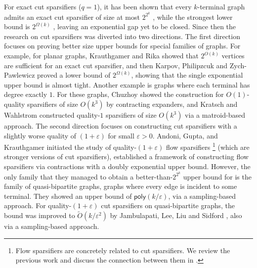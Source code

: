 \documentclass[11pt]{article}
\theoremstyle{definition}
\newcommand{\eps}{{\varepsilon}}
\newcommand{\poly}{\mathsf{poly}}
\newcounter{note}
\begin{document}
For exact cut sparsifiers ($q=1$), it has been shown that every $k$-terminal graph admits an exact cut sparsifier of size at most $2^{2^k}$ \cite{hagerup1998characterizing,khan2014mimicking}, while the strongest lower bound is $2^{\Omega(k)}$ \cite{khan2014mimicking,karpov2017exponential}, leaving an exponential gap yet to be closed.
Since then the research on cut sparsifiers was diverted into two directions.
The first direction focuses on proving better size upper bounds for special families of graphs.
For example, for planar graphs, Krauthgamer and Rika \cite{krauthgamer2013mimicking,krauthgamer2017refined} showed that $2^{O(k)}$ vertices are sufficient for an exact cut sparsifier, and then Karpov, Philipzcuk and Zych-Pawlewicz \cite{karpov2017exponential} proved a lower bound of $2^{\Omega(k)}$, showing that the single exponential upper bound is almost tight.
Another example is graphs where each terminal has degree exactly $1$. For these graphs, Chuzhoy \cite{chuzhoy2012vertex} showed the construction for $O(1)$-quality sparsifiers of size $O(k^3)$ by contracting expanders, and Kratsch and Wahlstrom \cite{kratsch2012representative} constructed quality-$1$ sparsifiers of size $O(k^3)$ via a matroid-based approach.
The second direction focuses on constructing cut sparsifiers with a slightly worse quality of $(1+\eps)$ for small $\eps>0$.
Andoni, Gupta, and Krauthgamer \cite{andoni2014towards} initiated the study of quality-$(1+\eps)$ flow sparsifiers \footnote{Flow sparsifiers are concretely related to cut sparsifiers. We review the previous work and discuss the connection between them in .} (which are stronger versions of cut sparsifiers), established a framework of constructing flow sparsifiers via contractions with a doubly exponential upper bound. However, the only family that they managed to obtain a better-than-$2^{2^k}$ upper bound for is the family of quasi-bipartite graphs, graphs where every edge is incident to some terminal. They showed an upper bound of $\poly(k/\eps)$, via a sampling-based approach.
For quality-$(1+\eps)$ cut sparsifiers on quasi-bipartite graphs, the bound was improved to $\tilde O(k/\eps^2)$ by Jambulapati, Lee, Liu and Sidford \cite{jambulapati2023sparsifying}, also via a sampling-based approach.
\end{document}
